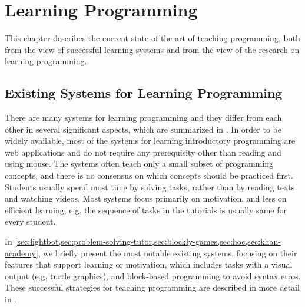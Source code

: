 \chapter{Learning Programming}
\label{chap:learning-programming}


This chapter describes the current state of the art of teaching programming, both from the view of successful learning systems and from the view of the research on learning programming.

\section{Existing Systems for Learning Programming}
\label{sec:existing-systems}

There are many systems for learning programming and they differ from each other
in several significant aspects, which are summarized in .
In order to be widely available, most of the systems for learning introductory programming
are web applications and do not require any prerequisity other than reading
and using mouse.
The systems %
often teach only a small subset of programming concepts,
and there is no consensus on which concepts should be practiced first. %
Students usually spend most time by solving tasks, rather than
by reading texts and watching videos.
Most systems focus primarily on motivation, and less on efficient learning,
e.g. the sequence of tasks in the tutorials is usually same for every student.

In \cref{sec:lightbot,sec:problem-solving-tutor,sec:blockly-games,sec:hoc,sec:khan-academy},
we briefly present the most notable existing systems,
focusing on their features that support learning or motivation,
which includes tasks with a visual output (e.g. turtle graphics),
and block-based programming to avoid syntax erros.
These successful strategies for teaching programming are described in
more detail in .

